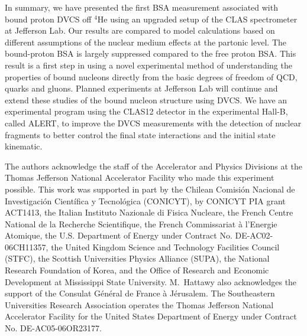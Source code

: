 \documentclass[twocolumn,nofootinbib,prl,superscriptaddress,secnumarabic,amssymb,nobibnotes,aps,floatfix]{revtex4}
\begin{document}
In summary, we have presented the first BSA measurement associated with bound 
proton DVCS off $^4$He using an upgraded setup of the CLAS spectrometer at 
Jefferson Lab. Our results are compared to model calculations based on 
different assumptions of the nuclear medium effects at the partonic level. The 
bound-proton BSA is largely suppressed compared to the free proton BSA. This 
result is a first step in using a novel experimental method of understanding 
the properties of bound nucleons directly from the basic degrees of freedom of 
QCD, quarks and gluons. Planned experiments at Jefferson Lab will continue 
and extend these studies of the bound nucleon structure using DVCS. We have 
an experimental program using the CLAS12 detector in the experimental Hall-B, 
called ALERT, to improve the DVCS measurements with the detection of nuclear
fragments to better control the final state interactions and the initial state
kinematic.


The authors acknowledge the staff of the Accelerator and Physics Divisions at 
the Thomas Jefferson National Accelerator Facility who made this experiment 
possible. This work was supported in part by the Chilean Comisi\'on Nacional de 
Investigaci\'on Cient\'ifica y Tecnol\'ogica (CONICYT), by CONICYT PIA grant 
ACT1413, the Italian Instituto Nazionale di Fisica Nucleare, the French Centre 
National de la Recherche Scientifique, the French Commissariat \`a l'Energie 
Atomique, the U.S.  Department of Energy under Contract No. DE-AC02-06CH11357, 
the United Kingdom Science and Technology Facilities Council (STFC), the 
Scottish Universities Physics Alliance (SUPA), the National Research Foundation 
of Korea, and the Office of Research and Economic Development at Mississippi 
State University.  M.~Hattawy also acknowledges the support of the Consulat 
G\'en\'eral de France \`a J\'erusalem.  The Southeastern Universities Research 
Association operates the Thomas Jefferson National Accelerator Facility for the 
United States Department of Energy under Contract No. DE-AC05-06OR23177.
\end{document}
